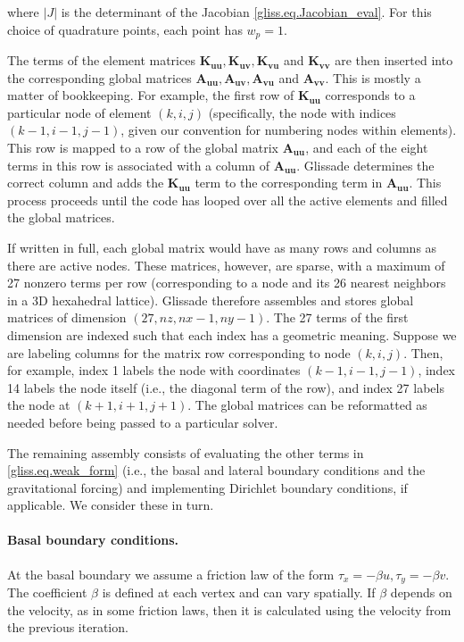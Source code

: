 \noindent
where $|J|$ is the determinant of the Jacobian \eqref{gliss.eq.Jacobian_eval}. For this choice of quadrature points,
each point has $w_p = 1$.

The terms of the element matrices $\mathbf{K_{uu}}, \mathbf{K_{uv}}, \mathbf{K_{vu}}$ and $\mathbf{K_{vv}}$
are then inserted into the corresponding global matrices $\mathbf{A_{uu}}, \mathbf{A_{uv}}, \mathbf{A_{vu}}$ and $\mathbf{A_{vv}}$.
This is mostly a matter of bookkeeping.
For example, the first row of $\mathbf{K_{uu}}$ corresponds to a particular node of element $(k,i,j)$
(specifically, the node with indices $(k-1,i-1,j-1)$, given our convention for numbering nodes within elements).  
This row is mapped to a row of the global matrix $\mathbf{A_{uu}}$, 
and each of the eight terms in this row is associated with a column of $\mathbf{A_{uu}}$.  
Glissade determines the correct column
and adds the $\mathbf{K_{uu}}$ term to the corresponding term in $\mathbf{A_{uu}}$.  This process proceeds
until the code has looped over all the active elements and filled the global matrices.

If written in full, each global matrix would have as many rows and columns as there are active nodes.
These matrices, however, are sparse, with a maximum of 27 nonzero terms per row (corresponding to
a node and its 26 nearest neighbors in a 3D hexahedral lattice).
Glissade therefore assembles and stores global matrices of dimension $(27,nz,nx-1,ny-1)$.
The 27 terms of the first dimension are indexed such that each index has a geometric meaning.
Suppose we are labeling columns for the matrix row corresponding to node $(k,i,j)$. 
Then, for example, index 1 labels the node with coordinates $(k-1,i-1,j-1)$, index 14 labels the
node itself (i.e., the diagonal term of the row), and index 27 labels the node at $(k+1,i+1,j+1)$.
The global matrices can be reformatted as needed before being passed to a particular solver. 

The remaining assembly consists of evaluating the other terms in \eqref{gliss.eq.weak_form}
(i.e., the basal and lateral boundary conditions and the gravitational forcing) and implementing
Dirichlet boundary conditions, if applicable. We consider these in turn.

\paragraph{Basal boundary conditions.}

At the basal boundary we assume
a friction law of the form $\tau_x = -\beta u, \tau_y = -\beta v$.  The coefficient $\beta$ is defined
at each vertex and can vary spatially.  If $\beta$ depends on the velocity, as in some friction laws,
then it is calculated using the velocity from the previous iteration.

